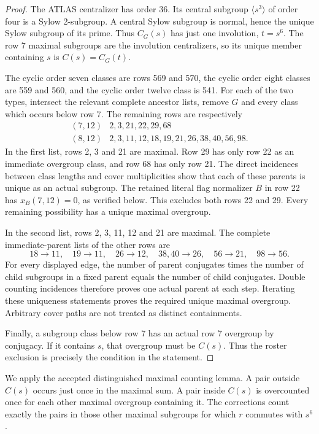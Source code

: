 \documentclass[11pt,a4paper]{article}
\begin{document}
\begin{proof}
The ATLAS centralizer has order 36. Its central subgroup
$\langle s^3\rangle$ of order four is a Sylow 2-subgroup. A central
Sylow subgroup is normal, hence the unique Sylow subgroup of its
prime. Thus $C_G(s)$ has just one involution, $t=s^6$.
The row 7 maximal subgroups are the involution centralizers, so
its unique member containing $s$ is $C(s)=C_G(t)$.

The cyclic order seven classes are rows 569 and 570, the cyclic order
eight classes are 559 and 560, and the cyclic order twelve class is
541. For each of the two types, intersect the relevant complete ancestor
lists, remove $G$ and every class which occurs below row 7. The
remaining rows are respectively
\[
\begin{array}{c|l}
(7,12)&2,3,21,22,29,68\\
(8,12)&2,3,11,12,18,19,21,26,38,40,56,98.
\end{array}                                                     \tag{2}
\]
In the first list, rows 2, 3 and 21 are maximal. Row 29 has only
row 22 as an immediate overgroup class, and row 68 has only row 21.
The direct incidences between class lengths and cover multiplicities
show that each of these parents is unique as an actual subgroup.
The retained literal flag normalizer $B$ in row 22 has $x_B(7,12)=0$,
as verified below. This excludes both rows 22 and 29. Every remaining
possibility has a unique maximal overgroup.

In the second list, rows 2, 3, 11, 12 and 21 are maximal. The complete
immediate-parent lists of the other rows are
\[
18\longrightarrow11,\quad19\longrightarrow11,\quad
26\longrightarrow12,\quad38,40\longrightarrow26,\quad
56\longrightarrow21,\quad98\longrightarrow56.
\]
For every displayed edge, the number of parent conjugates times the
number of child subgroups in a fixed parent equals the number of
child conjugates. Double counting incidences therefore proves one
actual parent at each step. Iterating these uniqueness statements
proves the required unique maximal overgroup. Arbitrary cover paths
are not treated as distinct containments.

Finally, a subgroup class below row 7 has an actual row 7 overgroup
by conjugacy. If it contains $s$, that overgroup must be $C(s)$.
Thus the roster exclusion is precisely the condition in the statement.
\end{proof}

We apply the accepted distinguished maximal counting lemma. A pair
outside $C(s)$ occurs just once in the maximal sum. A pair inside
$C(s)$ is overcounted once for each other maximal overgroup containing
it. The corrections count exactly the pairs in those other maximal
subgroups for which $r$ commutes with $s^6$.
\end{document}
